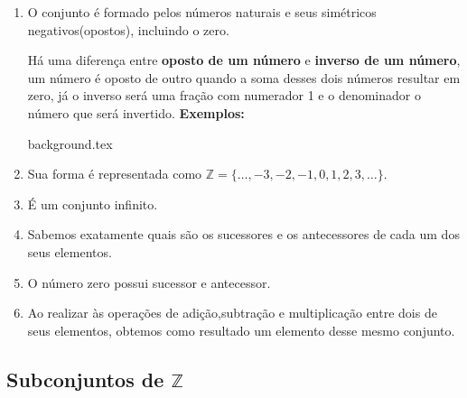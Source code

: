 \documentclass[10pt]{article}
\begin{document}
    \begin{enumerate}[label=\textbf{(\Roman*)}]
        \item O conjunto é formado pelos números naturais e seus simétricos negativos(opostos), incluindo o zero.
            \begin{obs}
                Há uma diferença entre \textbf{oposto de um número} e \textbf{inverso de um número}, um número é oposto de outro quando a soma desses dois números resultar em zero, já o inverso será uma fração com numerador 1 e o denominador o número que será invertido.
                \textbf{Exemplos:}
                \begin{enumerate}
                \end{enumerate}
            \end{obs}
\newpage
{background.tex} %
        \item Sua forma é representada como \( \mathbb{Z} = \{\ldots, -3, -2, -1, 0, 1, 2, 3, \ldots\}\).
        \item É um conjunto infinito.
        \item Sabemos exatamente quais são os sucessores e os antecessores de cada um dos seus elementos.
        \item O número zero possui sucessor e antecessor.
        \item Ao realizar às operações de adição,subtração e multiplicação entre dois de seus elementos, obtemos como resultado um elemento desse mesmo conjunto.
    \end{enumerate}
\subsection*{Subconjuntos de \( \mathbb{Z} \)}
\end{document}
